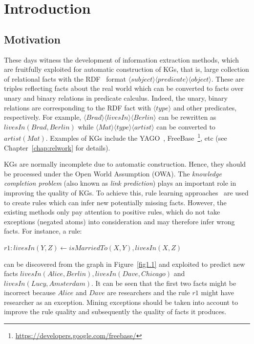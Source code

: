 \chapter{Introduction}
\label{chap:intro}

\section{Motivation}
\label{chap:motivation}

These days witness the development of information extraction methods, which are fruitfully exploited for automatic construction of KGs, that is, large collection of relational facts with the RDF~\cite{ref38} format $\langle subject \rangle \langle predicate \rangle \langle object \rangle$. These are triples reflecting facts about the real world which can be converted to facts over unary and binary relations in predicate calculus. Indeed, the unary, binary relations are corresponding to the RDF fact with $\langle type \rangle$ and other predicates, respectively. For example, $\langle Brad \rangle \langle livesIn \rangle \langle Berlin \rangle$ can be rewritten as $livesIn(Brad, Berlin)$ while $\langle Mat \rangle \langle type \rangle \langle artist \rangle$ can be converted to $artist(Mat)$. Examples of KGs include the YAGO~\cite{ref28}, FreeBase~\footnote{\url{https://developers.google.com/freebase/}}, etc (see Chapter~\ref{chap:relwork} for details).

KGs are normally incomplete due to automatic construction. Hence, they should be processed under the Open World Assumption (OWA). The \textit{knowledge completion problem} (also known as \textit{link prediction}) plays an important role in improving the quality of KGs. To achieve this, rule learning approaches~\cite{ref39, ref10} are used to create rules which can infer new potentially missing facts. However, the existing methods only pay attention to positive rules, which do not take exceptions (negated atoms) into consideration and may therefore infer wrong facts. For instance, a rule:

\begin{center}
$r1: livesIn(Y,Z) \leftarrow isMarriedTo(X,Y), livesIn(X,Z)$
\end{center}

can be discovered from the graph in Figure~\ref{fig1.1} and exploited to predict new facts $livesIn(Alice, Berlin), livesIn(Dave, Chicago)$ and $livesIn(Lucy, Amsterdam)$. It can be seen that the first two facts might be incorrect because $Alice$ and $Dave$ are researchers and the rule $r1$ might have researcher as an exception. Mining exceptions should be taken into account to improve the rule quality and subsequently the quality of facts it produces.

